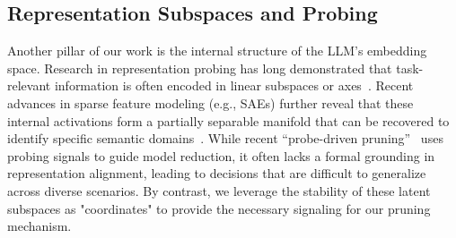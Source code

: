 \subsection{Representation Subspaces and Probing}
\vspace{-1mm}
Another pillar of our work is the internal structure of the LLM's embedding space. Research in representation probing has long demonstrated that task-relevant information is often encoded in linear subspaces or axes~\cite{alain2016linearprobes,belinkov2022probing}. Recent advances in sparse feature modeling (e.g., SAEs) further reveal that these internal activations form a partially separable manifold that can be recovered to identify specific semantic domains~\cite{gao2024sae_scaling,bricken2023dictionary}. While recent ``probe-driven pruning''~\cite{le2025probe} uses probing signals to guide model reduction, it often lacks a formal grounding in representation alignment, leading to decisions that are difficult to generalize across diverse scenarios. By contrast, we leverage the stability of these latent subspaces as "coordinates" to provide the necessary signaling for our pruning mechanism.

